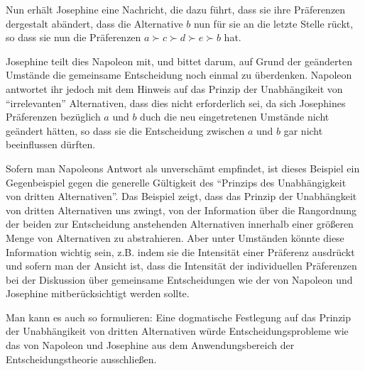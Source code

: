 \begin{enumerate}
Nun erhält Josephine eine Nachricht, die dazu führt, dass sie ihre Präferenzen
dergestalt abändert, dass die Alternative $b$ nun für sie an die letzte Stelle
rückt, so dass sie nun die Präferenzen $a \succ c \succ d \succ e \succ b$ hat. 

Josephine teilt dies Napoleon mit, und bittet darum, auf Grund der geänderten
Umstände die gemeinsame Entscheidung noch einmal zu überdenken. Napoleon
antwortet ihr jedoch mit dem Hinweis auf das Prinzip der Unabhängikeit von
"`irrelevanten"' Alternativen, dass dies nicht erforderlich sei, da sich
Josephines Präferenzen bezüglich $a$ und $b$ duch die neu eingetretenen Umstände nicht
geändert hätten, so dass sie die Entscheidung zwischen $a$ und $b$ gar nicht
beeinflussen dürften.

Sofern man Napoleons Antwort als unverschämt empfindet, ist dieses Beispiel ein
Gegenbeispiel gegen die generelle Gültigkeit des "`Prinzips des Unabhängigkeit
von dritten Alternativen"'. Das Beispiel zeigt, dass das Prinzip der
Unabhängkeit von dritten Alternativen uns zwingt, von der Information über die
Rangordnung der beiden zur Entscheidung anstehenden Alternativen innerhalb einer
größeren Menge von Alternativen zu abstrahieren. Aber unter Umständen könnte
diese Information wichtig sein, z.B. indem sie die Intensität einer Präferenz
ausdrückt und sofern man der Ansicht ist, dass die Intensität der
individuellen Präferenzen bei der Diskussion über gemeinsame Entscheidungen wie
der von Napoleon und Josephine mitberücksichtigt werden sollte.

Man kann es auch so formulieren: Eine dogmatische Festlegung auf das Prinzip
der Unabhängikeit von dritten Alternativen würde Entscheidungsprobleme wie das
von Napoleon und Josephine aus dem Anwendungsbereich der Entscheidungstheorie
ausschließen.


\end{enumerate}
 
